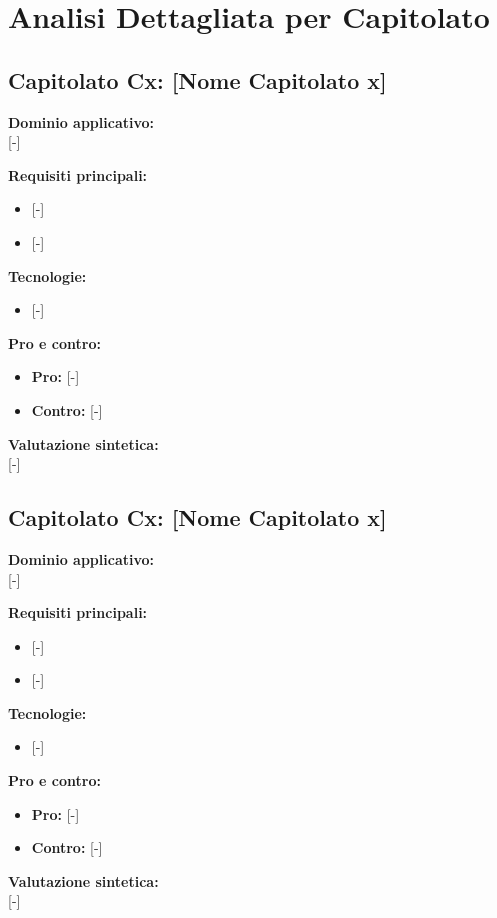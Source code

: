 \section{Analisi Dettagliata per Capitolato}

\subsection{Capitolato Cx: {[Nome Capitolato x]} }

\textbf{Dominio applicativo:} \\
{[-]}

\vspace{0.3cm}
\textbf{Requisiti principali:}
\begin{itemize}
	\item {[-]}
	\item {[-]}
\end{itemize}

\vspace{0.3cm}
\textbf{Tecnologie:}
\begin{itemize}
	\item {[-]}
\end{itemize}

\vspace{0.3cm}
\textbf{Pro e contro:}
\begin{itemize}
	\item \textbf{Pro:} {[-]}
	\item \textbf{Contro:} {[-]}
\end{itemize}

\vspace{0.3cm}
\textbf{Valutazione sintetica:} \\
{[-]}

\vspace{0.5cm}

\vspace{0.5cm}

\subsection{Capitolato Cx: {[Nome Capitolato x]} }

\textbf{Dominio applicativo:} \\
{[-]}

\vspace{0.3cm}
\textbf{Requisiti principali:}
\begin{itemize}
	\item {[-]}
	\item {[-]}
\end{itemize}

\vspace{0.3cm}
\textbf{Tecnologie:}
\begin{itemize}
	\item {[-]}
\end{itemize}

\vspace{0.3cm}
\textbf{Pro e contro:}
\begin{itemize}
	\item \textbf{Pro:} {[-]}
	\item \textbf{Contro:} {[-]}
\end{itemize}

\vspace{0.3cm}
\textbf{Valutazione sintetica:} \\
{[-]}

\newpage